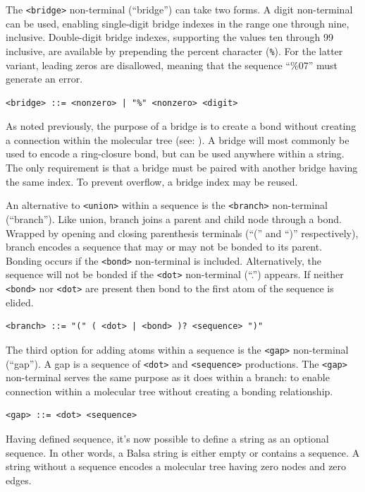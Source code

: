 \documentclass{article}
\def\ttt{\texttt}
\begin{document}
The \ttt{<bridge>} non-terminal (\enquote{bridge}) can take two forms. A digit non-terminal can be used, enabling single-digit bridge indexes in the range one through nine, inclusive. Double-digit bridge indexes, supporting the values ten through 99 inclusive, are available by prepending the percent character (\ttt{\%}). For the latter variant, leading zeros are disallowed, meaning that the sequence \enquote{\%07} must generate an error.

\begin{lstlisting}
<bridge> ::= <nonzero> | "%" <nonzero> <digit>
\end{lstlisting}

As noted previously, the purpose of a bridge is to create a bond without creating a connection within the molecular tree (see: ). A bridge will most commonly be used to encode a ring-closure bond, but can be used anywhere within a string. The only requirement is that a bridge must be paired with another bridge having the same index. To prevent overflow, a bridge index may be reused.

An alternative to \ttt{<union>} within a sequence is the \ttt{<branch>} non-terminal (\enquote{branch}). Like union, branch joins a parent and child node through a bond. Wrapped by opening and closing parenthesis terminals (\enquote{(} and \enquote{)} respectively), branch encodes a sequence that may or may not be bonded to its parent. Bonding occurs if the \ttt{<bond>} non-terminal is included. Alternatively, the sequence will not be bonded if the \ttt{<dot>} non-terminal (\enquote{.}) appears. If neither \ttt{<bond>} nor \ttt{<dot>} are present then bond to the first atom of the sequence is elided.

\begin{lstlisting}
<branch> ::= "(" ( <dot> | <bond> )? <sequence> ")"
\end{lstlisting}

The third option for adding atoms within a sequence is the \ttt{<gap>} non-terminal (\enquote{gap}). A gap is a sequence of \ttt{<dot>} and \ttt{<sequence>} productions. The \ttt{<gap>} non-terminal serves the same purpose as it does within a branch: to enable connection within a molecular tree without creating a bonding relationship.

\begin{lstlisting}
<gap> ::= <dot> <sequence>
\end{lstlisting}

Having defined sequence, it's now possible to define a string as an optional sequence. In other words, a Balsa string is either empty or contains a sequence. A string without a sequence encodes a molecular tree having zero nodes and zero edges.
\end{document}
